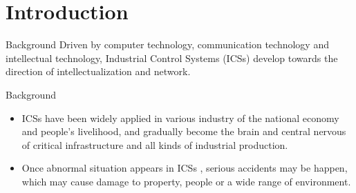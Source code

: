 \label{Section: Introduction}
\section{Introduction}

\begin{frame}{Background}\label{Introduction: Development of ICSs}
    Driven by computer technology, communication technology and intellectual technology, Industrial Control Systems (ICSs) develop towards the direction of intellectualization and network.
    \begin{center}
        
    \end{center}
\end{frame}

\begin{frame}{Background}\label{Introduction: ICSs are Important}
    \begin{itemize}
      \item ICSs have been widely applied in various industry of the national economy and people's livelihood, and gradually become the brain and central nervous of critical infrastructure and all kinds of industrial production.
      \item Once abnormal situation appears in ICSs , serious accidents may be happen, which may cause damage to property, people or a wide range of environment.
    \end{itemize}


\end{frame}
